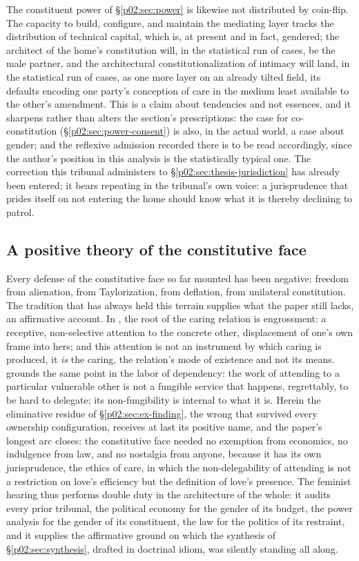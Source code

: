 The constituent power of \S\ref{p02:sec:power} is likewise not distributed by coin-flip. The capacity to build, configure, and maintain the mediating layer tracks the distribution of technical capital, which is, at present and in fact, gendered; the architect of the home's constitution will, in the statistical run of cases, be the male partner, and the architectural constitutionalization of intimacy will land, in the statistical run of cases, as one more layer on an already tilted field, its defaults encoding one party's conception of care in the medium least available to the other's amendment. This is a claim about tendencies and not essences, and it sharpens rather than alters the section's prescriptions: the case for co-constitution (\S\ref{p02:sec:power-consent}) is also, in the actual world, a case about gender; and the reflexive admission recorded there is to be read accordingly, since the author's position in this analysis is the statistically typical one. The correction this tribunal administers to \S\ref{p02:sec:thesis-jurisdiction} has already been entered; it bears repeating in the tribunal's own voice: a jurisprudence that prides itself on not entering the home should know what it is thereby declining to patrol.

\subsection{A positive theory of the constitutive face}
\label{p02:sec:fem-positive}

Every defense of the constitutive face so far mounted has been negative: freedom from alienation, from Taylorization, from deflation, from unilateral constitution. The tradition that has always held this terrain supplies what the paper still lacks, an affirmative account. In \textcite{noddings1984caring}, the root of the caring relation is engrossment: a receptive, non-selective attention to the concrete other, displacement of one's own frame into hers; and this attention is not an instrument by which caring is produced, it \emph{is} the caring, the relation's mode of existence and not its means. \textcite{kittay1999love} grounds the same point in the labor of dependency: the work of attending to a particular vulnerable other is not a fungible service that happens, regrettably, to be hard to delegate; its non-fungibility is internal to what it is. Herein the eliminative residue of \S\ref{p02:sec:ex-finding}, the wrong that survived every ownership configuration, receives at last its positive name, and the paper's longest arc closes: the constitutive face needed no exemption from economics, no indulgence from law, and no nostalgia from anyone, because it has its own jurisprudence, the ethics of care, in which the non-delegability of attending is not a restriction on love's efficiency but the definition of love's presence. The feminist hearing thus performs double duty in the architecture of the whole: it audits every prior tribunal, the political economy for the gender of its budget, the power analysis for the gender of its constituent, the law for the politics of its restraint, and it supplies the affirmative ground on which the synthesis of \S\ref{p02:sec:synthesis}, drafted in doctrinal idiom, was silently standing all along.

